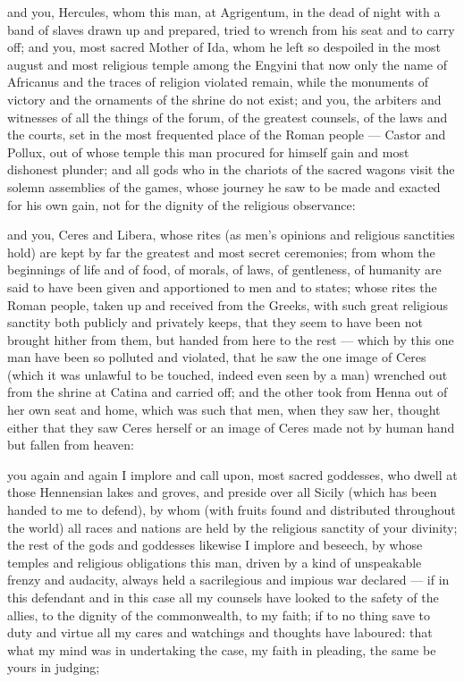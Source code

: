  and you, Hercules, whom this man, at Agrigentum, in the dead of night with a band of slaves drawn up and prepared, tried to wrench from his seat and to carry off; and you, most sacred Mother of Ida, whom he left so despoiled in the most august and most religious temple among the Engyini that now only the name of Africanus and the traces of religion violated remain, while the monuments of victory and the ornaments of the shrine do not exist; and you, the arbiters and witnesses of all the things of the forum, of the greatest counsels, of the laws and the courts, set in the most frequented place of the Roman people --- Castor and Pollux, out of whose temple this man procured for himself gain and most dishonest plunder; and all gods who in the chariots of the sacred wagons visit the solemn assemblies of the games, whose journey he saw to be made and exacted for his own gain, not for the dignity of the religious observance:

 and you, Ceres and Libera, whose rites (as men's opinions and religious sanctities hold) are kept by far the greatest and most secret ceremonies; from whom the beginnings of life and of food, of morals, of laws, of gentleness, of humanity are said to have been given and apportioned to men and to states; whose rites the Roman people, taken up and received from the Greeks, with such great religious sanctity both publicly and privately keeps, that they seem to have been not brought hither from them, but handed from here to the rest --- which by this one man have been so polluted and violated, that he saw the one image of Ceres (which it was unlawful to be touched, indeed even seen by a man) wrenched out from the shrine at Catina and carried off; and the other took from Henna out of her own seat and home, which was such that men, when they saw her, thought either that they saw Ceres herself or an image of Ceres made not by human hand but fallen from heaven:

 you again and again I implore and call upon, most sacred goddesses, who dwell at those Hennensian lakes and groves, and preside over all Sicily (which has been handed to me to defend), by whom (with fruits found and distributed throughout the world) all races and nations are held by the religious sanctity of your divinity; the rest of the gods and goddesses likewise I implore and beseech, by whose temples and religious obligations this man, driven by a kind of unspeakable frenzy and audacity, always held a sacrilegious and impious war declared --- if in this defendant and in this case all my counsels have looked to the safety of the allies, to the dignity of the commonwealth, to my faith; if to no thing save to duty and virtue all my cares and watchings and thoughts have laboured: that what my mind was in undertaking the case, my faith in pleading, the same be yours in judging;

